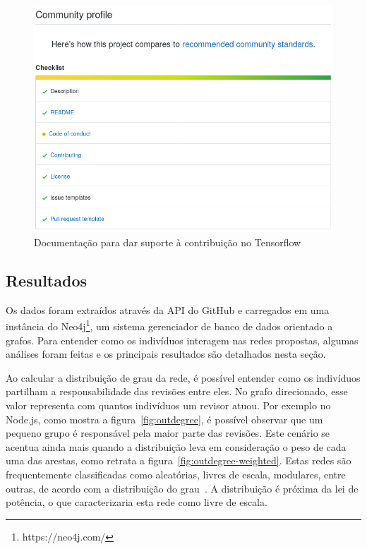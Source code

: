 \documentclass[12pt,openany,oneside,a4paper,english,brazil]{abntbibufjf}
\begin{document}
\begin{figure}[htbp]
 \includegraphics[width=\textwidth]{community-profile}
 \caption{Documentação para dar suporte à contribuição no Tensorflow}\label{fig:community-profile}
\end{figure}



  \subsection{Resultados}

  Os dados foram extraídos através da API do GitHub e carregados em uma instância do Neo4j\footnote{https://neo4j.com/}, um sistema gerenciador de banco de dados orientado a grafos. Para entender como os indivíduos interagem nas redes propostas, algumas análises foram feitas e os principais resultados são detalhados nesta seção.

  Ao calcular a distribuição de grau da rede, é possível entender como os indivíduos partilham a responsabilidade das revisões entre eles. No grafo direcionado, esse valor representa com quantos indivíduos um revisor atuou. Por exemplo no Node.js, como mostra a figura~\ref{fig:outdegree}, é possível observar que um pequeno grupo é responsável pela maior parte das revisões. Este cenário se acentua ainda mais quando a distribuição leva em consideração o peso de cada uma das arestas, como retrata a figura~\ref{fig:outdegree-weighted}. Estas redes são frequentemente classificadas como aleatórias, livres de escala, modulares, entre outras, de acordo com a distribuição do grau~\cite{cross2004}. A distribuição é próxima da lei de potência, o que caracterizaria esta rede como livre de escala.
\end{document}
